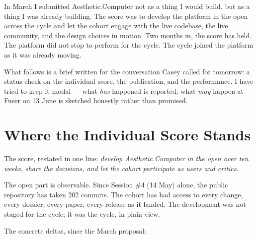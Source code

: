 \documentclass[11pt,letterpaper]{article}
\newcommand{\ac}{Aesthetic\textcolor{acpink}{.}Computer}
\begin{document}
\thispagestyle{empty}
\vspace*{0.4in}


In March I submitted \ac{} not as a thing I would build, but as a thing I was already building. The score was to develop the platform in the open across the cycle and let the cohort engage with the live codebase, the live community, and the design choices in motion. Two months in, the score has held. The platform did not stop to perform for the cycle. The cycle joined the platform as it was already moving.

What follows is a brief written for the conversation Casey called for tomorrow: a status check on the individual score, the publication, and the performance. I have tried to keep it modal --- what \emph{has} happened is reported, what \emph{may} happen at Fuser on 13 June is sketched honestly rather than promised.

\section{Where the Individual Score Stands}

The score, restated in one line: \emph{develop \ac{} in the open over ten weeks, share the decisions, and let the cohort participate as users and critics.}

The open part is observable. Since Session \#4 (14 May) alone, the public repository has taken 202 commits. The cohort has had access to every change, every dossier, every paper, every release as it landed. The development was not staged for the cycle; it was the cycle, in plain view.

The concrete deltas, since the March proposal:
\end{document}
